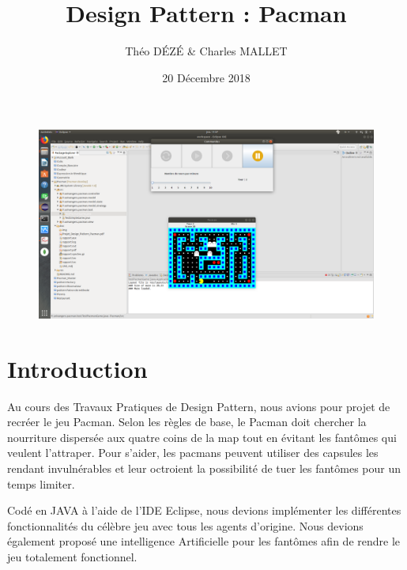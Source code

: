 \documentclass[a4paper, 11pt]{article}
\begin{document}
\title{Design Pattern : Pacman}
\author{Théo \textsc{DÉZÉ}  \& Charles \textsc {MALLET}}
\date{20 Décembre 2018} 


\maketitle

\vspace{2cm}
\begin{figure}[ht]

\includegraphics[scale=0.7,trim=26.2cm 5cm 23.9cm 17.7cm, clip=true]{img/Pacman.png}

\end{figure}


\newpage

\tableofcontents

\pagebreak

\part*{Introduction}

Au cours des Travaux Pratiques de Design Pattern, nous avions pour projet de recréer le jeu Pacman. Selon les règles de base, le Pacman doit chercher la nourriture dispersée aux quatre 
coins de la map tout en évitant les fantômes qui veulent l'attraper. Pour s'aider, les pacmans peuvent utiliser des capsules les rendant invulnérables et leur octroient 
la possibilité de tuer les fantômes pour un temps limiter.

Codé en JAVA à l'aide de l'IDE Eclipse, nous devions implémenter les différentes fonctionnalités du célèbre jeu avec tous les agents d'origine. Nous devions également
proposé une intelligence Artificielle pour les fantômes afin de rendre le jeu totalement fonctionnel. 
\end{document}
